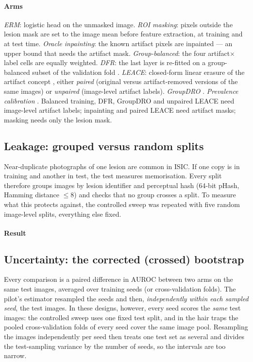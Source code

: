 \paragraph{Arms} \emph{ERM}: logistic head on the unmasked image. \emph{ROI masking}: pixels outside the lesion mask are
set to the image mean before feature extraction, at training and at test time. \emph{Oracle inpainting}: the known
artifact pixels are inpainted \citep{telea2004inpainting} --- an upper bound that needs the artifact mask.
\emph{Group-balanced}: the four artifact$\times$label cells are equally weighted. \emph{DFR}: the last layer is re-fitted
on a group-balanced subset of the validation fold \citep{kirichenko2023dfr}. \emph{LEACE}: closed-form linear erasure of
the artifact concept \citep{belrose2023leace}, either \emph{paired} (original versus artifact-removed versions of the
same images) or \emph{unpaired} (image-level artifact labels). \emph{GroupDRO} \citep{sagawa2020groupdro}.
\emph{Prevalence calibration} \citep{kina2026prevalence}. Balanced training, DFR, GroupDRO and unpaired LEACE need
image-level artifact labels; inpainting and paired LEACE need artifact masks; masking needs only the lesion mask.

\subsection{Leakage: grouped versus random splits}\label{sec:leak}
Near-duplicate photographs of one lesion are common in ISIC. If one copy is in training and another in test, the test
measures memorisation. Every split therefore groups images by lesion identifier and perceptual hash (64-bit pHash,
Hamming distance $\le8$) and checks that no group crosses a split. To measure what this protects against, the
controlled sweep was repeated with five random image-level splits, everything else fixed.
\paragraph{Result} 


\subsection{Uncertainty: the corrected (crossed) bootstrap}\label{sec:bootstrap}
Every comparison is a paired difference in AUROC between two arms on the same test images, averaged over training
seeds (or cross-validation folds). The pilot's estimator resampled the seeds and then, \emph{independently within each
sampled seed}, the test images. In these designs, however, every seed scores the \emph{same} test images: the
controlled sweep uses one fixed test split, and in the hair traps the pooled cross-validation folds of every seed cover
the same image pool. Resampling the images independently per seed then treats one test set as several and divides the
test-sampling variance by the number of seeds, so the intervals are too narrow.
